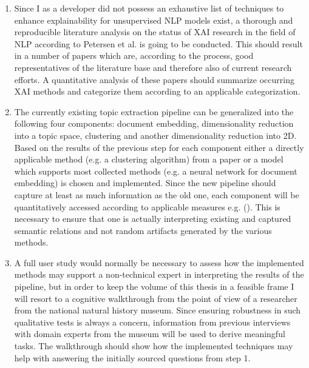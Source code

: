 \begin{enumerate}
	\item Since I as a developer did not possess an exhaustive list of techniques to enhance explainability for unsupervised NLP models exist, a thorough and reproducible literature analysis on the status of XAI research in the field of NLP according to Petersen et al. \cite{petersenSystematicMappingStudies2008a} is going to be conducted. This should result in a number of papers which are, according to the process, good representatives of the literature base and therefore also of current research efforts. A quantitative analysis of these papers should summarize occurring XAI methods and categorize them according to an applicable categorization. 
	
	\item The currently existing topic extraction pipeline can be generalized into the following four components: document embedding, dimensionality reduction into a topic space, clustering and another dimensionality reduction into 2D. Based on the results of the previous step for each component either a directly applicable method (e.g. a clustering algorithm) from a paper or a model which supports most collected methods (e.g. a neural network for document embedding) is chosen and implemented. Since the new pipeline should capture at least as much information as the old one, each component will be quantitatively accessed according to applicable measures e.g. (\cite{roderExploringSpaceTopic2015a}). This is necessary to ensure that one is actually interpreting existing and captured semantic relations and not random artifacts generated by the various methods.
	
	\item A full user study would normally be necessary to assess how the implemented methods may support a non-technical expert in interpreting the results of the pipeline, but in order to keep the volume of this thesis in a feasible frame I will resort to a cognitive walkthrough from the point of view of a researcher from the national natural history museum.
	Since ensuring robustness in such qualitative tests is always a concern, information from previous interviews with domain experts from the museum will be used to derive meaningful tasks. The walkthrough should show how the implemented techniques may help with answering the initially sourced questions from step 1.
\end{enumerate}

